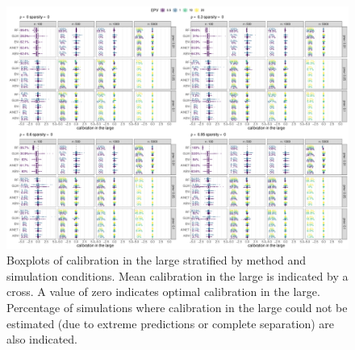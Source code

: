 \begin{subappendices}
\begin{landscape}
\begin{figure}[!ht]
\center
\includegraphics[width=0.9\linewidth]{images/paper6/figureS6.pdf}
\caption{Boxplots of calibration in the large stratified by method and
  simulation conditions. Mean calibration in the large is indicated by a cross.
  A value of zero indicates optimal calibration in the large. Percentage of
  simulations where calibration in the large could not be estimated (due to
  extreme predictions or complete separation) are also
  indicated.} \label{fig6:clarge}
\end{figure}
\end{landscape}

\end{subappendices}

\newpage



